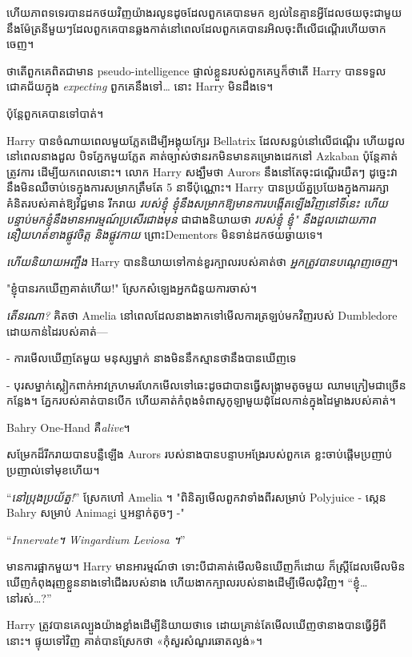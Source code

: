{{{ហើយភាពទទេរបានដកថយវិញយ៉ាងរលូនដូចដែលពួកគេបានមក ខ្យល់នៃគ្មានអ្វីដែលថយចុះជាមួយនឹងម៉ែត្រនីមួយៗដែលពួកគេបានឆ្លងកាត់នៅពេលដែលពួកគេបានរអិលចុះពីលើជណ្តើរហើយចាកចេញ។

ថាតើពួកគេពិតជាមាន pseudo-intelligence ផ្ទាល់ខ្លួនរបស់ពួកគេឬក៏ថាតើ Harry បានទទួលជោគជ័យក្នុង \emph{expecting} ពួកគេនឹងទៅ… នោះ Harry មិនដឹងទេ។

ប៉ុន្តែ​ពួកគេ​បាន​ទៅ​បាត់។

Harry បានចំណាយពេលមួយភ្លែតដើម្បីអង្គុយក្បែរ Bellatrix ដែលសន្លប់នៅលើជណ្តើរ ហើយដួលនៅពេលនាងដួល បិទភ្នែកមួយភ្លែត គាត់ច្បាស់ថានរកមិនមានគម្រោងដេកនៅ Azkaban ប៉ុន្តែគាត់ត្រូវការ ដើម្បីយកពេលនោះ។ លោក Harry សង្ឃឹមថា Aurors នឹងនៅតែចុះជណ្តើរយឺតៗ ដូច្នេះវានឹងមិនឈឺចាប់ទេក្នុងការសម្រាកត្រឹមតែ 5 នាទីប៉ុណ្ណោះ។ Harry បានប្រយ័ត្នប្រយែងក្នុងការរក្សាគំនិតរបស់គាត់ឱ្យវិជ្ជមាន រីករាយ \emph{របស់ខ្ញុំ ខ្ញុំនឹងសម្រាកឱ្យមានការបង្កើតឡើងវិញនៅទីនេះ ហើយបន្ទាប់មកខ្ញុំនឹងមានអារម្មណ៍ប្រសើរជាងមុន} ជាជាងនិយាយថា \emph{របស់ខ្ញុំ ខ្ញុំ" នឹង​ដួល​ដោយ​ភាព​នឿយហត់​ខាង​ផ្លូវ​ចិត្ត និង​ផ្លូវ​កាយ} ព្រោះ​ Dementors មិន​ទាន់​ដក​ថយ​ឆ្ងាយ​ទេ។

\emph{ហើយនិយាយអញ្ចឹង} Harry បាននិយាយទៅកាន់ខួរក្បាលរបស់គាត់ថា \emph{អ្នកត្រូវបានបណ្តេញចេញ}។

\later

"ខ្ញុំបានរកឃើញគាត់ហើយ!" ស្រែក​សំឡេង​អ្នក​ជំនួយការ​ចាស់។

\emph{តើនរណា?} គិតថា Amelia នៅពេលដែលនាងងាកទៅមើលការត្រឡប់មកវិញរបស់ Dumbledore ដោយកាន់ដៃរបស់គាត់—

- ការមើលឃើញតែមួយ មនុស្សម្នាក់ នាងមិននឹកស្មានថានឹងបានឃើញទេ

- បុរស​ម្នាក់​ស្លៀក​ពាក់​អាវ​ក្រហម​រហែក​មើល​ទៅ​ឆេះ​ដូច​ជា​បាន​ធ្វើ​សង្គ្រាម​តូច​មួយ ឈាម​ក្រៀម​ជា​ច្រើន​កន្លែង។ ភ្នែករបស់គាត់បានបើក ហើយគាត់កំពុងទំពាសូកូឡាមួយដុំដែលកាន់ក្នុងដៃម្ខាងរបស់គាត់។

Bahry One-Hand គឺ\emph{alive}។

សម្រែក​ដ៏​រីករាយ​បាន​បន្លឺ​ឡើង Aurors របស់​នាង​បាន​បន្ទាប​អង្រែ​របស់​ពួកគេ ខ្លះ​ចាប់ផ្តើម​ប្រញាប់ប្រញាល់​ទៅ​មុខ​ហើយ។

“\emph{នៅប្រុងប្រយ័ត្ន!}” ស្រែកហៅ Amelia ។ "ពិនិត្យមើលពួកវាទាំងពីរសម្រាប់ Polyjuice - ស្កេន Bahry សម្រាប់ Animagi ឬអន្ទាក់តូចៗ -"

\later

“\emph{Innervate។ Wingardium Leviosa ។}”

មានការផ្អាកមួយ។ Harry មានអារម្មណ៍ថា ទោះបីជាគាត់មើលមិនឃើញក៏ដោយ ក៏ស្ត្រីដែលមើលមិនឃើញកំពុងរុញខ្លួននាងទៅជើងរបស់នាង ហើយងាកក្បាលរបស់នាងដើម្បីមើលជុំវិញ។ “ខ្ញុំ…នៅរស់…?”

Harry ត្រូវ​បាន​គេ​ល្បួង​យ៉ាង​ខ្លាំង​ដើម្បី​និយាយ​ថា​ទេ ដោយ​គ្រាន់​តែ​មើល​ឃើញ​ថា​នាង​បាន​ធ្វើ​អ្វី​ពី​នោះ។ ផ្ទុយ​ទៅ​វិញ គាត់​បាន​ស្រែក​ថា «កុំ​សួរ​សំណួរ​ឆោតល្ងង់»។

}}}
